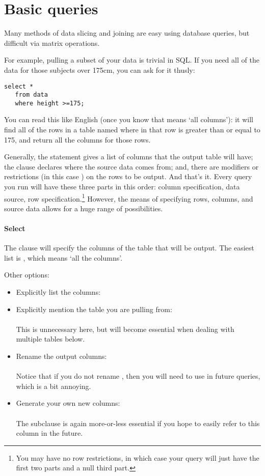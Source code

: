 \section{Basic queries}
Many methods of data slicing and joining are easy using database queries,
but difficult via matrix operations.

For example, pulling a subset of your data is trivial in SQL. If
you need all of the data for those subjects over 175cm, you can ask for
it thusly:
\begin{lstlisting}
select * 
   from data 
   where height >=175;
\end{lstlisting}

You can read this like English (once you know that \sinline{*} means `all
columns'): it will find all of the rows in a table named 
where  in that row is greater than or equal to 175, and
return all the columns for those rows.


Generally, the  statement gives a list of columns that
the output table will have; the  clause declares where the
source data comes from; and, there are modifiers or restrictions
(in this case ) on the rows to be output.  And that's
it. Every query you run will have these three parts in this order: column
specification, data source, row specification.\footnote{You may have no
row restrictions, in which case your query will just have the first two
parts and a null third part.} However, the means of specifying rows,
columns, and source data allows for a huge range of possibilities.

\paragraph{Select}
The  clause will specify the columns of the table that will
be output. The easiest list is \sinline{*}, which means `all the columns'.

Other options:\begin{itemize}
\item Explicitly list the columns:\\ 
\item Explicitly mention the table you are pulling from:\\
\\
This is unnecessary here, but will become
essential when dealing with multiple tables below.
\item Rename the output columns:\\
\\ 
Notice that if you do not rename , then you will need to use  in future
queries, which is a
bit annoying.
\item Generate your own new columns:\\
\\
The  subclause is again more-or-less
essential if you hope to easily refer to this column in the future. 
\end{itemize}


